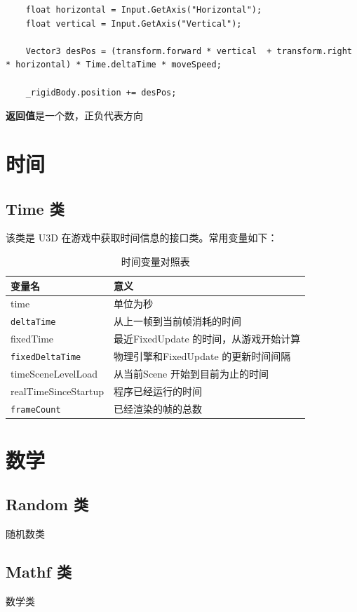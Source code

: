 \documentclass[UTF8,a4paper,12pt]{ctexbook}
\begin{document}
		 	\begin{lstlisting}
	float horizontal = Input.GetAxis("Horizontal");
	float vertical = Input.GetAxis("Vertical");
	
	Vector3 desPos = (transform.forward * vertical  + transform.right * horizontal) * Time.deltaTime * moveSpeed;
	
	_rigidBody.position += desPos;
		 	\end{lstlisting}
		\textbf{返回值}是一个数，正负代表方向
			
\chapter{时间}
 	\section{Time 类}
 		该类是 U3D 在游戏中获取时间信息的接口类。常用变量如下：
 		
 		\begin{table}[H]
 			\centering
 			\caption{时间变量对照表}
 			\begin{tabular}{m{4cm}|m{10cm}}
 				\toprule
 					变量名 & 意义\\
 				\midrule
 					time & 单位为秒 \\
 					\verb|deltaTime|     & 从上一帧到当前帧消耗的时间 \\
 					fixedTime     & 最近FixedUpdate 的时间，从游戏开始计算 \\
 					\verb|fixedDeltaTime|     & 物理引擎和FixedUpdate 的更新时间间隔 \\
 					timeSceneLevelLoad     & 从当前Scene 开始到目前为止的时间 \\
 					realTimeSinceStartup     & 程序已经运行的时间 \\
 					\verb|frameCount|     & 已经渲染的帧的总数 \\
 				\bottomrule 
 			\end{tabular}
 		\end{table}
 		 		

\chapter{数学}
	\section{Random 类}
		随机数类
		
	\section{Mathf 类}
		数学类
	
\end{document}
